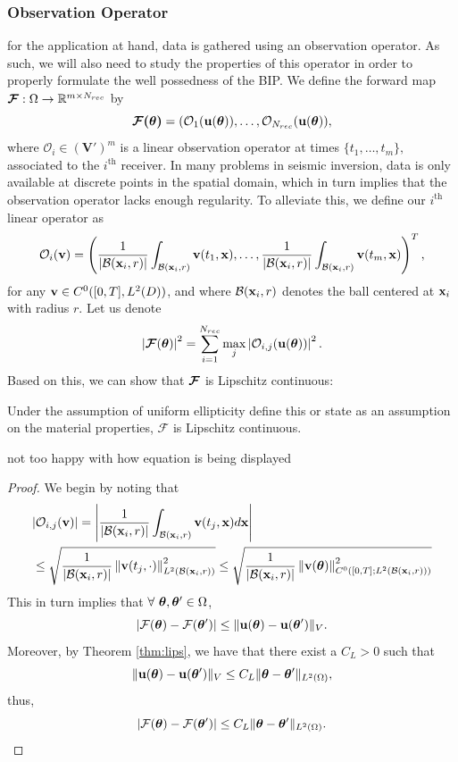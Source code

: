 \subsubsection{Observation Operator}
for the application at hand, data is gathered using an observation operator. As such, we will also need to study the properties of this operator in order to properly formulate the well possedness of the BIP.  We define the forward map $\bm{\mathcal{F}}:\Omega\rightarrow\mathbb{R}^{m\times N_{rec}}$ by  $$\bm{\mathcal{F}(\bm{\theta})}=(\mathcal{O}_1(\mathbf{u}(\bm{\theta})),\dots,\mathcal{O}_{N_{rec}}(\mathbf{u}(\bm{\theta})),$$ where $\mathcal{O}_i\in(\mathbf{V}')^m$ is a linear observation operator at times $\{t_1,\dots,t_m \},$ associated to the $i^\text{th}$ receiver. In many problems in seismic inversion, data is only available at discrete points in the spatial domain, which in turn implies that the observation operator lacks enough regularity. To alleviate this, we define our $i^\text{th}$ linear operator as \begin{align}
\mathcal{O}_i(\mathbf{v})=\left(\frac{1}{|\mathcal{B}(\mathbf{x}_i,r)|}\int_{{\mathcal{B}(\mathbf{x}_i,r)}}\mathbf{v}(t_1,\mathbf{x}),\dots,\frac{1}{|\mathcal{B}(\mathbf{x}_i,r)|}\int_{{\mathcal{B}(\mathbf{x}_i,r)}}\mathbf{v}(t_m,\mathbf{x})\right)^T,
\end{align} for any $\mathbf{v}\in C^0([0,T],L^2(D))$, and where $\mathcal{B}(\mathbf{x}_i,r)$ denotes the ball centered at $\mathbf{x}_i$ with radius $r$. Let us denote $$\left \vert \bm{\mathcal{F}} (\bm{\theta})\right \vert^2=\sum_{i=1}^{N_{rec}}\max_j\left \vert\mathcal{O}_{i,j}(\mathbf{u}(\bm{\theta}))\right \vert^2.$$ 
Based on this, we can show that $\bm{\mathcal{F}}$ is Lipschitz continuous:
\begin{proposition}\label{prop:bdd_obs} Under the assumption of uniform ellipticity \color{red} define this or state as an assumption\color{black} on the material properties, $\bm{\mathcal{F}}$ is Lipschitz continuous. 	
\end{proposition} \color{red} not too happy with how equation is being displayed\color{black}
\begin{proof}
	We begin by noting that \begin{align}&| \mathcal{O}_{i,j}(\mathbf{v})|=
	\left \vert \frac{1}{|\mathcal{B}(\mathbf{x}_i,r)|}\int_{\mathcal{B}(\mathbf{x}_i,r)} \mathbf{v}(t_j,\mathbf{x})d\mathbf{x}\right \vert\nonumber \\&\leq \sqrt{ \frac{1}{|\mathcal{B}(\mathbf{x}_i,r)|}\left \Vert \mathbf{v}(t_j,\cdot)\right \Vert^2_{L^2(\mathcal{B}(\mathbf{x}_i,r))}  }\leq \sqrt{ \frac{1}{|\mathcal{B}(\mathbf{x}_i,r)|}\left \Vert \mathbf{v}(\bm{\theta})\right \Vert^2_{C^0([0,T];L^2(\mathcal{B}(\mathbf{x}_i,r)))}}
	\end{align}
	 This in turn implies that  $\forall\  \bm{\theta},\bm{\theta}'\in\Omega$, $$|\mathcal{F}(\bm{\theta})-\mathcal{F}(\bm{\theta}')|\leq \Vert \mathbf{u}(\bm{\theta})-\mathbf{u}(\bm{\theta}')\Vert_V.$$
Moreover, by Theorem \ref{thm:lips}, we have that there exist a $C_L>0$ such that $$\Vert \mathbf{u}(\bm{\theta})-\mathbf{u}(\bm{\theta}')\Vert_V\leq C_L\Vert \bm{\theta}-\bm{\theta}'\Vert_{L^2(\Omega)},$$
thus, 
$$ |\mathcal{F}(\bm{\theta})-\mathcal{F}(\bm{\theta}')|\leq C_L\Vert \bm{\theta}-\bm{\theta}'\Vert_{L^2(\Omega)}.$$\end{proof}
